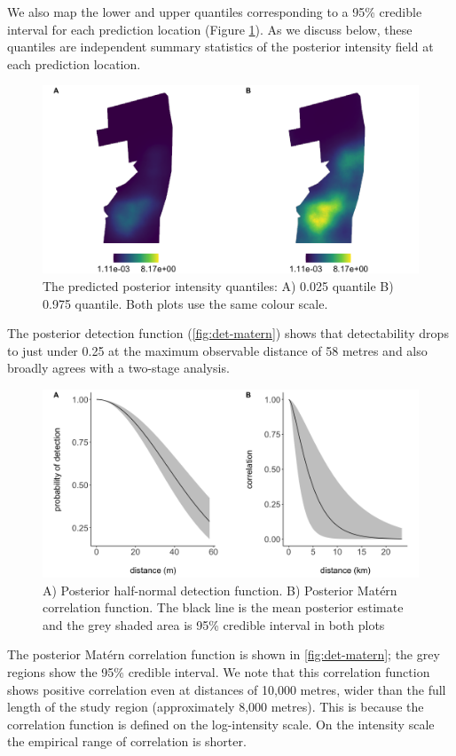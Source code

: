 \documentclass{statsoc}
\begin{document}
We also map the lower and upper quantiles corresponding to a 95\% credible interval for each prediction location (Figure \ref{fig:intensity-quantiles}).  As we discuss below, these quantiles are independent summary statistics of the posterior intensity field at each prediction location.  
\begin{figure}[!htb]
	\begin{center}
		\includegraphics[scale=0.525]{figures/intensity_quantiles.png}
		\caption{The predicted posterior intensity quantiles:  A) 0.025 quantile B) 0.975 quantile.  Both plots use the same colour scale.}
		\label{fig:intensity-quantiles}
	\end{center}
\end{figure}

The posterior detection function (\autoref{fig:det-matern}) shows that detectability drops to just under 0.25 at the maximum observable distance of 58 metres and also broadly agrees with a two-stage analysis.
\begin{figure}[!htb]
	\begin{center}
		\includegraphics[scale=0.525]{figures/detfn_and_matern.png}
		\caption{A) Posterior half-normal detection function. B) Posterior Mat\'ern correlation function.  The black line is the mean posterior estimate and the grey shaded area is 95\% credible interval in both plots}
		\label{fig:det-matern}
	\end{center}
\end{figure}
The posterior Mat\'ern correlation function is shown in \autoref{fig:det-matern}; the grey regions show the 95\% credible interval.  We note that this correlation function shows positive correlation even at distances of 10,000 metres, wider than the full length of the study region (approximately 8,000 metres).  This is because the correlation function is defined on the log-intensity scale.  On the intensity scale the empirical range of correlation is shorter.
\end{document}
